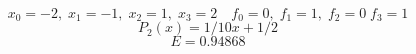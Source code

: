 \[ x_0=-2, \; x_1=-1, \; x_2=1, \; x_3=2 \quad f_0=0, \; f_1=1, \; f_2=0 \; f_3=1 \]
\[ P_2(x)=1/10 x + 1/2 \]
\[ E=0.94868 \]
